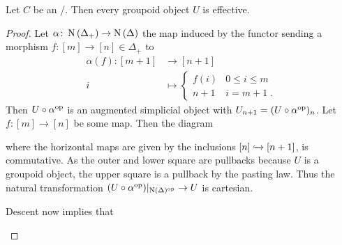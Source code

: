 \begin{prop}\label{prop:groupoidObjInToposAreEffective} %
    Let $C$ be an \inftytop/.
    Then every groupoid object $U$ is effective.
    \begin{proof}
        Let $\alpha\colon\operatorname{N}\left(\Delta_+\right)\to\operatorname{N}\left(\Delta\right)$ the map induced by the functor sending a morphism $f\colon [m]\to[n]\in\Delta_+$ to 
        \begin{align*}
            \alpha(f)\colon [m+1]&\to[n+1]\\
            i&\mapsto
            \begin{cases}
                f(i) & 0\leq i\leq m\\
                n+1 & i=m+1\;.
            \end{cases}
        \end{align*}
        Then $U\circ\alpha^{\operatorname{op}}$ is an augmented simplicial object with $U_{n+1}=(U\circ\alpha^{\operatorname{op}})_n$.
        Let $f\colon [m]\to[n]$ be some map. Then the diagram
        \begin{center}
        \end{center}
        where the horizontal maps are given by the inclusions $[n]\xhookrightarrow{}[n+1]$, is commutative. 
        As the outer and lower square are pullbacks because $U$ is a groupoid object, the upper square is a pullback by the pasting law.
        Thus the natural transformation $(U\circ\alpha^{\operatorname{op}})|_{\operatorname{N}(\Delta)^{\operatorname{op}}}\to U$ is cartesian.

        Descent now implies that 
        \begin{center}
\end{center}
\end{proof}
\end{prop}
